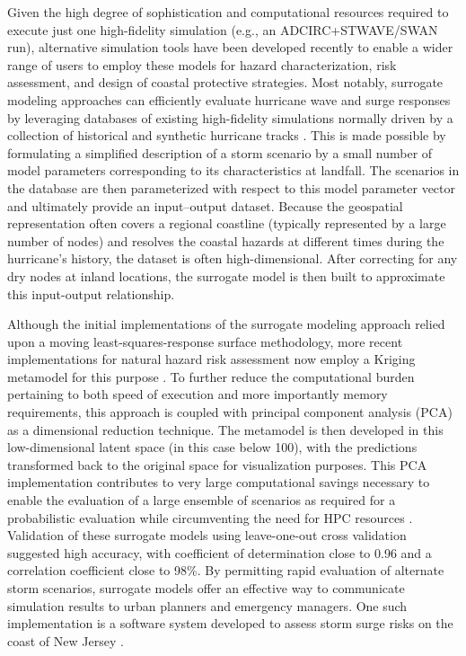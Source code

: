 Given the high degree of sophistication and computational resources required to execute just one high-fidelity simulation (e.g., an ADCIRC+STWAVE/SWAN run), alternative simulation tools have been developed recently to enable a wider range of users to employ these models for hazard characterization, risk assessment, and design of coastal protective strategies. Most notably, surrogate modeling approaches can efficiently evaluate hurricane wave and surge responses by leveraging databases of existing high-fidelity simulations normally driven by a collection of historical and synthetic hurricane tracks \citep{usace2015north}. This is made possible by formulating a simplified description of a storm scenario by a small number of model parameters corresponding to its characteristics at landfall. The scenarios in the database are then parameterized with respect to this model parameter vector and ultimately provide an input–output dataset. Because the geospatial representation often covers a regional coastline (typically represented by a large number of nodes) and resolves the coastal hazards at different times during the hurricane’s history, the dataset is often high-dimensional. After correcting for any dry nodes at inland locations, the surrogate model is then built to approximate this input-output relationship. 

Although the initial implementations of the surrogate modeling approach relied upon a moving least-squares-response surface methodology, more recent implementations for natural hazard risk assessment now employ a Kriging metamodel for this purpose \citep{jia2013kriging}. To further reduce the computational burden pertaining to both speed of execution and more importantly memory requirements, this approach is coupled with principal component analysis (PCA) as a dimensional reduction technique. The metamodel is then developed in this low-dimensional latent space (in this case below 100), with the predictions transformed back to the original space for visualization purposes. This PCA implementation contributes to very large computational savings necessary to enable the evaluation of a large ensemble of scenarios as required for a probabilistic evaluation while circumventing the need for HPC resources \citep{jia2013kriging}. Validation of these surrogate models using leave-one-out cross validation \citep{taflanidis2017advances} suggested high accuracy, with coefficient of determination close to 0.96 and a correlation coefficient close to 98\%. By permitting rapid evaluation of alternate storm scenarios, surrogate models offer an effective way to communicate simulation results to urban planners and emergency managers. One such implementation is a software system developed to assess storm surge risks on the coast of New Jersey \citep{njcoast2018implementation}.

